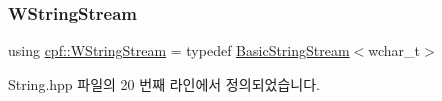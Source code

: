 \subsubsection{\texorpdfstring{W\+String\+Stream}{WStringStream}}
{\footnotesize\ttfamily using \hyperlink{namespacecpf_a7e79dec7a6790331bee7ef1e85dafba6}{cpf\+::\+W\+String\+Stream} = typedef \hyperlink{namespacecpf_a1fe334b3d2422535a1cfe51785d98cb8}{Basic\+String\+Stream}$<$wchar\+\_\+t$>$}



String.\+hpp 파일의 20 번째 라인에서 정의되었습니다.

